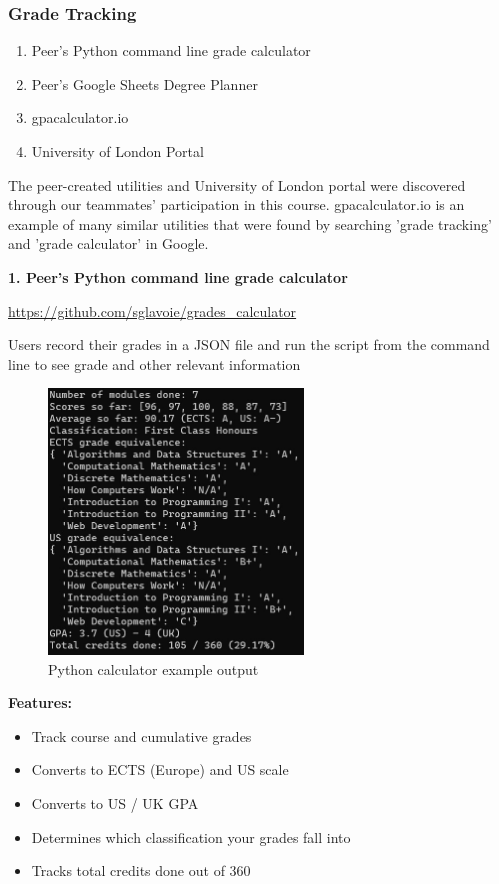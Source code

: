 \documentclass{article}
\begin{document}
\subsubsection{Grade Tracking}
\begin{enumerate}
  \item Peer's Python command line grade calculator
  \item Peer's Google Sheets Degree Planner
  \item gpacalculator.io
  \item University of London Portal
\end{enumerate}

\noindent The peer-created utilities and University of London portal were discovered through our teammates' participation in this course. gpacalculator.io is an example of many similar utilities that were found by searching 'grade tracking' and 'grade calculator' in Google.
\medskip

\noindent \textbf{1. Peer's Python command line grade calculator}

\noindent \url{https://github.com/sglavoie/grades_calculator}
\bigskip

\noindent Users record their grades in a JSON file and run the script from the command line to see grade and other relevant information
\bigskip

\begin{figure}[h]
\noindent \includegraphics[height=200pt]{py-example-output}
\centering
\caption{Python calculator example output}
\label{fig: py-calc}
\end{figure}

\noindent \textbf{Features:}
\begin{itemize}
\item Track course and cumulative grades
\item Converts to ECTS (Europe) and US scale
\item Converts to US / UK GPA
\item Determines which classification your grades fall into
\item Tracks total credits done out of 360
\end{itemize}
\medskip
\end{document}
